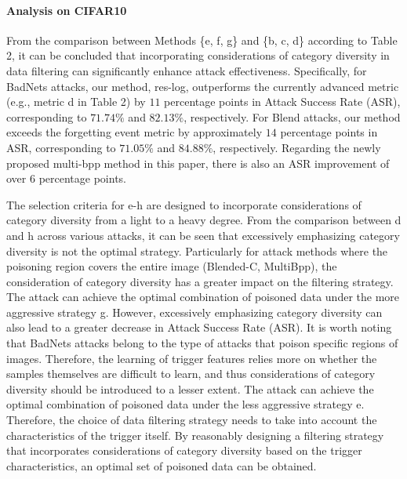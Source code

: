 \documentclass{article}
\begin{document}
\paragraph{Analysis on CIFAR10}
From the comparison between Methods \{e, f, g\} and \{b, c, d\} according to Table 2, it can be concluded that incorporating considerations of category diversity in data filtering can significantly enhance attack effectiveness. Specifically, for BadNets attacks, our method, res-log, outperforms the currently advanced metric (e.g., metric d in Table 2) by \(11\) percentage points in Attack Success Rate (ASR), corresponding to \(71.74\%\) and \(82.13\%\), respectively. For Blend attacks, our method exceeds the forgetting event metric by approximately \(14\) percentage points in ASR, corresponding to \(71.05\%\) and \(84.88\%\), respectively. Regarding the newly proposed multi-bpp method in this paper, there is also an ASR improvement of over \(6\) percentage points. 

The selection criteria for e-h are designed to incorporate considerations of category diversity from a light to a heavy degree. From the comparison between d and h across various attacks, it can be seen that excessively emphasizing category diversity is not the optimal strategy. Particularly for attack methods where the poisoning region covers the entire image (Blended-C, MultiBpp), the consideration of category diversity has a greater impact on the filtering strategy. The attack can achieve the optimal combination of poisoned data under the more aggressive strategy g. However, excessively emphasizing category diversity can also lead to a greater decrease in Attack Success Rate (ASR). It is worth noting that BadNets attacks belong to the type of attacks that poison specific regions of images. Therefore, the learning of trigger features relies more on whether the samples themselves are difficult to learn, and thus considerations of category diversity should be introduced to a lesser extent. The attack can achieve the optimal combination of poisoned data under the less aggressive strategy e. Therefore, the choice of data filtering strategy needs to take into account the characteristics of the trigger itself. By reasonably designing a filtering strategy that incorporates considerations of category diversity based on the trigger characteristics, an optimal set of poisoned data can be obtained.
\end{document}

